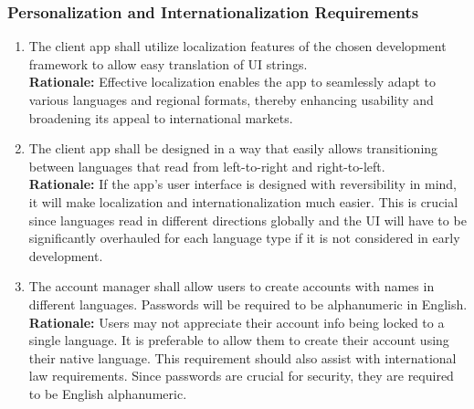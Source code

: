 \documentclass[]{article}
\begin{document}
\begin{enumerate}[{\bf BE1.}]
\subsubsection{Personalization and Internationalization Requirements}
\label{ssub:personalization_and_internationalization_requirements}
\begin{enumerate}[{UH-PI}1. ]
	\item The client app shall utilize localization features of the chosen development framework to allow easy translation of UI strings.\\
	\textbf{Rationale:} Effective localization enables the app to seamlessly adapt to various languages and regional formats, thereby enhancing usability and broadening its appeal to international markets.
	\item The client app shall be designed in a way that easily allows transitioning between languages that read from left-to-right and right-to-left.\\
	\textbf{Rationale:} If the app's user interface is designed with reversibility in mind, it will make localization and internationalization much easier. This is crucial
	since languages read in different directions globally and the UI will have to be significantly overhauled for each language type if it is not considered in early development. 
	\item The account manager shall allow users to create accounts with names in different languages. Passwords will be required to be alphanumeric in English.\\
	\textbf{Rationale:} Users may not appreciate their account info being locked to a single language. It is preferable to allow them to create their account using their native language.
	This requirement should also assist with international law requirements. Since passwords are crucial for security, they are required to be English alphanumeric.
\end{enumerate}


\end{enumerate}
\end{document}
